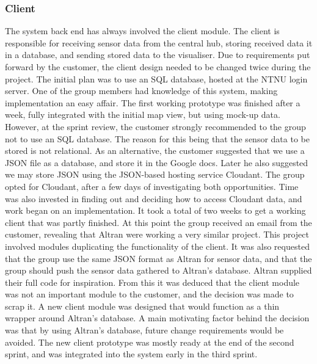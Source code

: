 \documentclass[../document.tex]{subfiles}
\begin{document}
\subsubsection{Client}
The system back end has always involved the client module. The client is responsible for receiving sensor data from the central hub, storing received data it in a database, and sending stored data to the visualiser. Due to requirements put forward by the customer, the client design needed to be changed twice during the project. The initial plan was to use an \gls{SQL} database, hosted at the \gls{NTNU} login server. One of the group members had knowledge of this system, making implementation an easy affair. The first working prototype was finished after a week, fully integrated with the initial map view, but using mock-up data. However, at the sprint review, the customer strongly recommended to the group not to use an \gls{SQL} database. The reason for this being that the sensor data to be stored is not relational. As an alternative, the customer suggested that we use a \gls{JSON} file as a database, and store it in the Google docs. Later he also suggested we may store \gls{JSON} using the \gls{JSON}-based hosting service \gls{Cloudant}. The group opted for \gls{Cloudant}, after a few days of investigating both opportunities. Time was also invested in finding out and deciding how to access \gls{Cloudant} data, and work began on an implementation. It took a total of two weeks to get a working client that was partly finished. At this point the group received an email from the customer, revealing that \gls{Altran} were working a very similar project. This project involved modules duplicating the functionality of the client. It was also requested that the group use the same \gls{JSON} format as \gls{Altran} for sensor data, and that the group should push the sensor data gathered to Altran’s database. \gls{Altran} supplied their full code for inspiration. From this it was deduced that the client module was not an important module to the customer, and the decision was made to scrap it. A new client module was designed that would function as a thin wrapper around Altran’s database. A main motivating factor behind the decision was that by using Altran’s database, future change requirements would be avoided. The new client prototype was mostly ready at the end of the second sprint, and was integrated into the system early in the third sprint.
\end{document}
